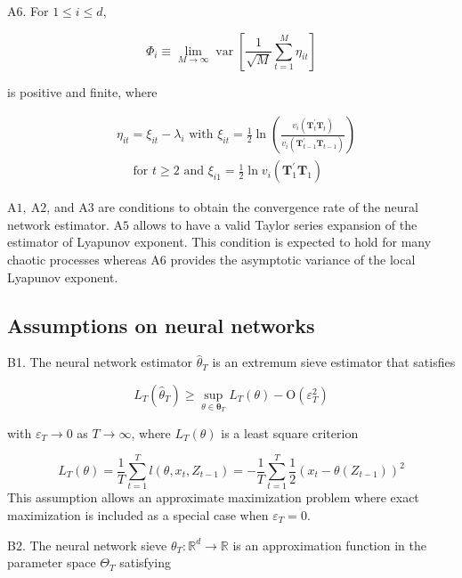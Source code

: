 \documentclass[12pt]{article}
\begin{document}
A6. For $1 \leqslant i \leqslant d$,

$$
\Phi_{i} \equiv \lim _{M \rightarrow \infty} \operatorname{var}\left[\frac{1}{\sqrt{M}} \sum_{t=1}^{M} \eta_{i t}\right]
$$

is positive and finite, where

$$
\begin{aligned}
& \eta_{i t}=\xi_{i t}-\lambda_{i} \text { with } \xi_{i t}=\frac{1}{2} \ln \left(\frac{v_{i}\left(\mathbf{T}_{t}^{\prime} \mathbf{T}_{t}\right)}{v_{i}\left(\mathbf{T}_{t-1}^{\prime} \mathbf{T}_{t-1}\right)}\right) \\
& \quad \text { for } t \geqslant 2 \text { and } \xi_{i 1}=\frac{1}{2} \ln v_{i}\left(\mathbf{T}_{1}^{\prime} \mathbf{T}_{1}\right)
\end{aligned}
$$


$\mathrm{A} 1, \mathrm{~A} 2$, and $\mathrm{A} 3$ are conditions to obtain the convergence rate of the neural network estimator.
$\mathrm{A} 5$ allows to have a valid Taylor series expansion of the estimator of Lyapunov exponent. This condition is expected to hold for many chaotic processes whereas $\mathrm{A} 6$ provides the asymptotic variance of the local Lyapunov exponent. 






\subsection*{ Assumptions on neural networks}
\hspace{\parindent} B1. The neural network estimator $\hat{\theta}_{T}$ is an extremum sieve estimator that satisfies

$$
L_{T}\left(\hat{\theta}_{T}\right) \geqslant \sup _{\theta \in \boldsymbol{\theta}_{T}} L_{T}(\theta)-\mathrm{O}\left(\varepsilon_{T}^{2}\right)
$$

with $\varepsilon_{T} \rightarrow 0$ as $T \rightarrow \infty$, where $L_{T}(\theta)$ is a least square criterion

$$
L_{T}(\theta)=\frac{1}{T} \sum_{t=1}^{T} l\left(\theta, x_{t}, Z_{t-1}\right)=-\frac{1}{T} \sum_{t=1}^{T} \frac{1}{2}\left(x_{t}-\theta\left(Z_{t-1}\right)\right)^{2}
$$
This assumption allows an approximate maximization problem where exact maximization is included as a special case when $\varepsilon_{T}=0$.


B2. The neural network sieve $\theta_{T}: \mathbb{R}^{d} \rightarrow \mathbb{R}$ is an approximation function in the parameter space $\Theta_{T}$ satisfying
\end{document}
